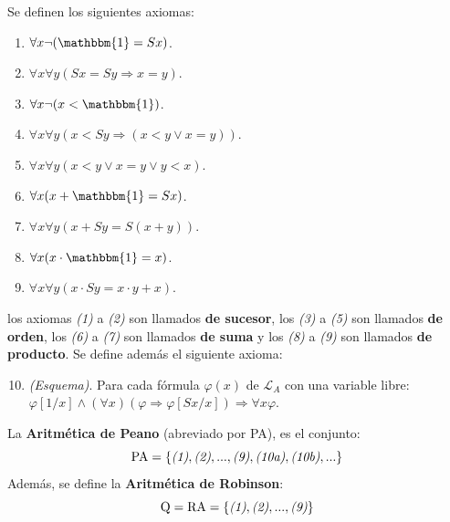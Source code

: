 \documentclass[12pt]{report}
\newcounter{it}
\theoremstyle{largebreak}
\newcommand{\bbm}[1]{\ensuremath{\mathbbm{#1}}}
\begin{document}
    \begin{mydef}
        Se definen los siguientes axiomas:
        \begin{enumerate}[label = \textit{(\arabic*)}]
            \item $\forall x\neg(\bbm{1}= Sx)$.
            \item $\forall x\forall y(Sx = Sy\Rightarrow x=y)$.
            \item $\forall x\neg(x<\bbm{1})$.
            \item $\forall x\forall y(x<Sy\Rightarrow(x<y\lor x=y))$.
            \item $\forall x\forall y(x<y\lor x=y\lor y<x)$.
            \item $\forall x(x+\bbm{1}=Sx)$.
            \item $\forall x\forall y(x+Sy=S(x+y))$.
            \item $\forall x(x\cdot\bbm{1}=x)$.
            \item $\forall x\forall y(x\cdot Sy=x\cdot y+x)$.
        \end{enumerate}
        los axiomas \textit{(1)} a \textit{(2)} son llamados \textbf{de sucesor}, los \textit{(3)} a \textit{(5)} son llamados \textbf{de orden}, los \textit{(6)} a \textit{(7)} son llamados \textbf{de suma} y los \textit{(8)} a \textit{(9)} son llamados \textbf{de producto}. Se define además el siguiente axioma:
        \begin{enumerate}[label = \textit{(\arabic*)}]
            \setcounter{enumi}{9}
            \item \textit{(Esquema)}. Para cada fórmula $\varphi(x)$ de $\mathcal{L}_A$ con una variable libre: $\varphi[1/x]\land(\forall x)(\varphi\Rightarrow\varphi[Sx/x])\Rightarrow \forall x\varphi$.
        \end{enumerate}

        La \textbf{Aritmética de Peano} (abreviado por PA), es el conjunto:
        \begin{equation*}
            \textup{PA}=\left\{\textup{\textit{(1)}},\textup{\textit{(2)}},...,\textup{\textit{(9)}},\textup{\textit{(10a)}},\textup{\textit{(10b)}},... \right\}
        \end{equation*}
        Además, se define la \textbf{Aritmética de Robinson}:
        \begin{equation*}
            \textup{Q}=\textup{RA}=\left\{\textup{\textit{(1)}},\textup{\textit{(2)}},...,\textup{\textit{(9)}} \right\}
        \end{equation*}
    \end{mydef}
\end{document}
